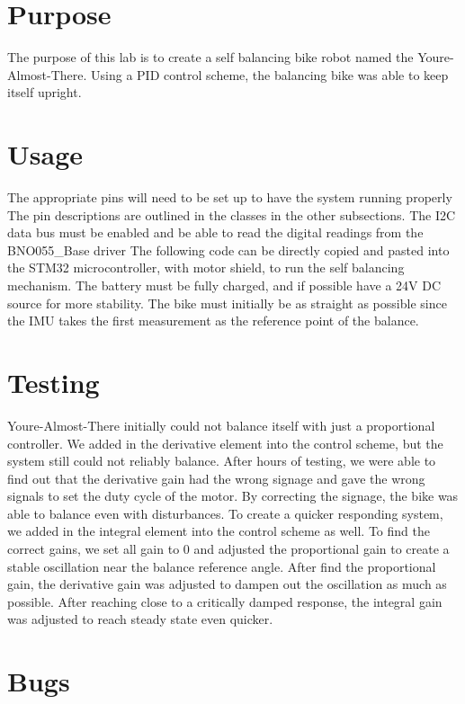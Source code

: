 \hypertarget{index_sec_purpose}{}\section{Purpose}\label{index_sec_purpose}
The purpose of this lab is to create a self balancing bike robot named the You\textquotesingle{}re-\/\+Almost-\/\+There. Using a P\+ID control scheme, the balancing bike was able to keep itself upright.\hypertarget{index_sec_usage}{}\section{Usage}\label{index_sec_usage}
The appropriate pins will need to be set up to have the system running properly The pin descriptions are outlined in the classes in the other subsections. The I2C data bus must be enabled and be able to read the digital readings from the B\+N\+O055\+\_\+\+Base driver The following code can be directly copied and pasted into the S\+T\+M32 microcontroller, with motor shield, to run the self balancing mechanism. The battery must be fully charged, and if possible have a 24V DC source for more stability. The bike must initially be as straight as possible since the I\+MU takes the first measurement as the reference point of the balance.\hypertarget{index_sec_test}{}\section{Testing}\label{index_sec_test}
You\textquotesingle{}re-\/\+Almost-\/\+There initially could not balance itself with just a proportional controller. We added in the derivative element into the control scheme, but the system still could not reliably balance. After hours of testing, we were able to find out that the derivative gain had the wrong signage and gave the wrong signals to set the duty cycle of the motor. By correcting the signage, the bike was able to balance even with disturbances. To create a quicker responding system, we added in the integral element into the control scheme as well. To find the correct gains, we set all gain to 0 and adjusted the proportional gain to create a stable oscillation near the balance reference angle. After find the proportional gain, the derivative gain was adjusted to dampen out the oscillation as much as possible. After reaching close to a critically damped response, the integral gain was adjusted to reach steady state even quicker.\hypertarget{index_sec_bug}{}\section{Bugs}\label{index_sec_bug}

